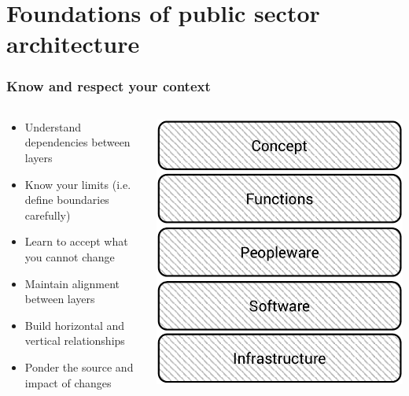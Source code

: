 \documentclass[10pt, compress]{beamer}
\begin{document}
\section{Foundations of public sector architecture}
\begin{frame}[fragile]
	\frametitle{Know and respect your context}
		\begin{columns}[T]
		\begin{column}{7.5cm}
			\begin{itemize}
				\item Understand dependencies between layers
				\item Know your limits (i.e. define boundaries carefully)
				\item Learn to accept what you cannot change
				\item Maintain alignment between layers
				\item Build horizontal and vertical relationships
				\item Ponder the source and impact of changes
			\end{itemize}
		\end{column}
		\begin{column}[T]{3.5cm}
			\includegraphics[width=\textwidth]{govlayers.pdf}
		\end{column}
	\end{columns}

\end{frame}
\end{document}

